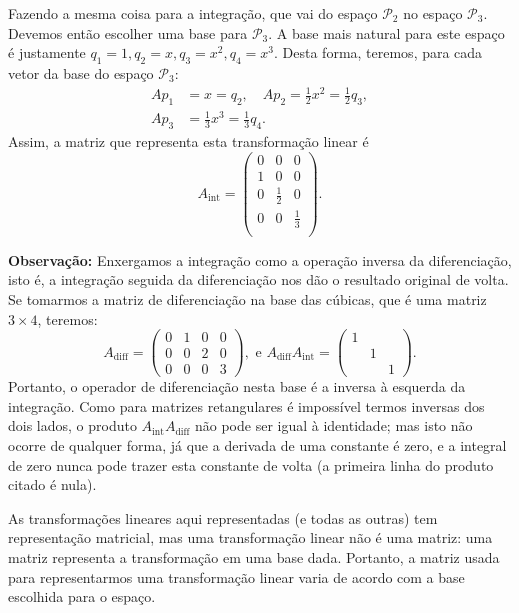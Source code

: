 Fazendo a mesma coisa para a integração, que vai do espaço ${\mathcal{P}}_2$ no espaço ${\mathcal{P}}_3$. Devemos então escolher uma base para ${\mathcal{P}}_3$. A base mais natural para este espaço é justamente $q_1=1, q_2=x, q_3=x^2,q_4 = x^3$. Desta forma, teremos, para cada vetor da base do espaço ${\mathcal{P}}_3$:
\begin{align*}
  Ap_1&=x=q_2, \quad Ap_2=\frac{1}{2}x^2=\frac{1}{2}q_3, \\
  Ap_3&=\frac{1}{3}x^3=\frac{1}{3}q_4.
\end{align*}
Assim, a matriz que representa esta transformação linear é 
\begin{equation*}
  A_{\text{int}} =
  \begin{pmatrix}
     0 & 0 & 0\\
     1 & 0 & 0\\
     0 & \frac{1}{2}& 0 \\
     0 & 0 & \frac{1}{3}\\
  \end{pmatrix}.
\end{equation*}

{\bf Observação:} Enxergamos a integração como a operação inversa da diferenciação, isto é, a integração seguida da diferenciação nos dão o resultado original de volta. Se tomarmos a matriz de diferenciação na base das cúbicas, que é uma matriz $3\times 4$, teremos:
\begin{equation*}
  A_{\text{diff}}=
  \begin{pmatrix}
     0 & 1 & 0 & 0\\
     0 & 0 & 2 & 0\\
     0 & 0 & 0 & 3
  \end{pmatrix}
  , \text{ e } A_{\text{diff}} A_{\text{int}} =
  \begin{pmatrix}
     1& & \\
     &1& \\
     & &1
  \end{pmatrix}.
\end{equation*}
Portanto, o operador de diferenciação nesta base é a inversa à esquerda da integração. Como para matrizes retangulares é impossível termos inversas dos dois lados, o produto $A_{\text{int}}A_{\text{diff}}$ não pode ser igual à identidade; mas isto não ocorre de qualquer forma, já que a derivada de uma constante é zero, e a integral de zero nunca pode trazer esta constante de volta (a primeira linha do produto citado é nula).

As transformações lineares aqui representadas (e todas as outras) tem representação matricial, mas uma transformação linear não é uma matriz: uma matriz representa a transformação em uma base dada. Portanto, a matriz usada para representarmos uma transformação linear varia de acordo com a base escolhida para o espaço.

